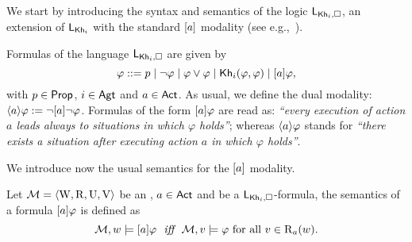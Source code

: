 We start by introducing the syntax and semantics of the logic $\mathsf{L}_{{\sf Kh}_i,\square}$,  an extension of $\mathsf{L}_{{\sf Kh}_i}$ with the standard $[a]$ modality (see e.g.,~\cite{HML,mlbook}).

\medskip

\begin{definition}\label{def:khimlsyntax}
Formulas of the language $\mathsf{L}_{{\sf Kh}_i,\square}$ are given by
\[
\varphi ::= p \mid \neg\varphi \mid \varphi\vee\varphi \mid {\sf Kh}_i(\varphi,\varphi) \mid [a]\varphi,
\]
with $p \in {\rm \sf Prop}$, $i \in {\rm \sf Agt}$ and $a \in {\rm \sf Act}$.
As usual, we define the dual modality: $\langle a \rangle\varphi := \neg[a]\neg\varphi$. Formulas of the form $[a]\varphi$ are read as: \emph{``every execution of action $a$ leads always to situations in which $\varphi$ holds''};
whereas  $\langle a \rangle\varphi$ stands for 
\emph{``there exists a situation after executing action $a$ in which $\varphi$ holds''}.
\end{definition}

\medskip

We introduce now the usual semantics for the $[a]$ modality.

\medskip

\begin{definition}\label{def:khimlsemantics}
Let $\mathcal{M} = \langle \operatorname{W}, \operatorname{R}, \operatorname{U}, \operatorname{V} \rangle$ be an \ults, $a \in {\rm \sf Act}$ and  be a $\mathsf{L}_{{\sf Kh}_i,\square}$-formula, the semantics of a formula $[a]\varphi$ is defined as
\[
\modults,w \models \mlbox{a}\varphi \ \ \iff \ \ \modults,v \models \varphi \mbox{ for all }v \in \R_a(w).
\]
\end{definition}
